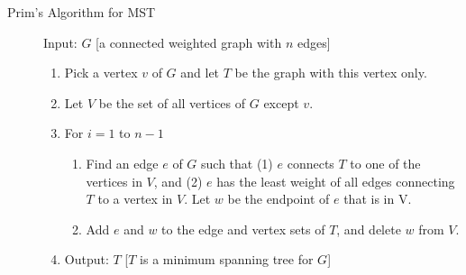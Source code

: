 \documentclass{article}
\begin{document}
\begin{description}
\begin{enumerate}
    \end{enumerate}
    \item[\ding{73} Prim's Algorithm for MST] Input: $G$ [a connected weighted graph with $n$ edges]
    \begin{enumerate}
    	\item Pick a vertex $v$ of $G$ and let $T$ be the graph with this vertex only.
		\item Let $V$ be the set of all vertices of $G$ except $v$.
		\item For $i = 1$ to $n - 1$
		\begin{enumerate}
			\item Find an edge $e$ of $G$ such that (1) $e$ connects $T$ to one of the vertices in $V$, and (2) $e$ has the least weight of all edges connecting $T$ to a vertex in $V$. Let $w$ be the endpoint of $e$ that is in V.
			\item Add $e$ and $w$ to the edge and vertex sets of $T$, and delete $w$ from $V$.
		\end{enumerate}
		\item Output: $T$ [$T$ is a minimum spanning tree for $G$]
    \end{enumerate}
    
	
\end{description}
\end{document}
